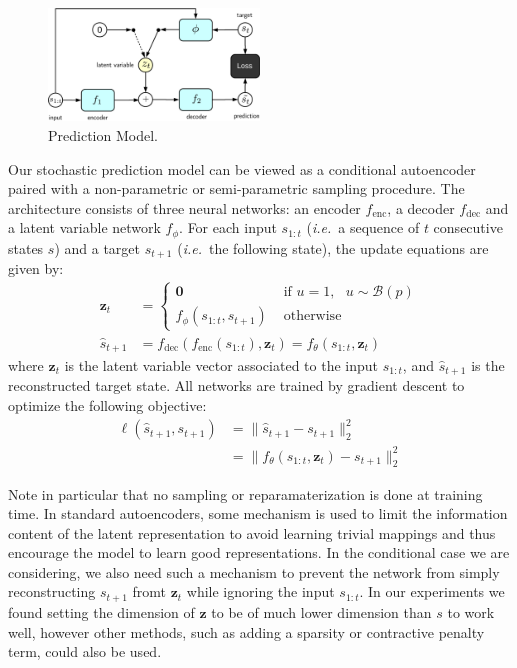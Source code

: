 \documentclass{article}
\begin{document}
\begin{figure}
  \centering
  \includegraphics[width=0.5\textwidth]{images/ae_train-crop.pdf}
  \caption{Prediction Model. }
\end{figure}

Our stochastic prediction model can be viewed as a conditional autoencoder paired with a non-parametric  or semi-parametric sampling procedure.
The architecture consists of three neural networks: an encoder $f_\text{enc}$, a decoder $f_\text{dec}$ and a latent variable network $f_\phi$.
For each input $s_{1:t}$ (\emph{i.e.}\ a sequence of $t$ consecutive states $s$) and a target $s_{t+1}$ (\emph{i.e.}\ the following state), the update equations are given by:
%
\begin{align}
  \bm{z}_t &=
  \begin{cases}
    \bm{0} & \mbox{   if   } u = 1, \mbox{   } u \sim \mathcal{B}(p) \\
    f_\phi(s_{1:t}, s_{t+1}) & \mbox{   otherwise}
  \end{cases} \\
  \hat{s}_{t+1} &= f_\text{dec}(f_\text{enc}(s_{1:t}), \bm{z}_t) = f_\theta(s_{1:t}, \bm{z}_t)
\end{align}
%
where $\bm{z}_t$ is the latent variable vector associated to the input $s_{1:t}$, and $\hat{s}_{t + 1}$ is the reconstructed target state.
All networks are trained by gradient descent to optimize the following objective:
%
\begin{align}
  \ell(\hat{s}_{t+1}, s_{t+1}) &= \lVert \hat{s}_{t+1} - s_{t+1} \rVert_2^2 \\
  &= \lVert f_\theta(s_{1:t}, \bm{z}_t) - s_{t+1} \rVert_2^2
\end{align}

Note in particular that no sampling or reparamaterization is done at training time.
In standard autoencoders, some mechanism is used to limit the information content of the latent representation to avoid learning trivial mappings and thus encourage the model to learn good representations.
In the conditional case we are considering, we also need such a mechanism to prevent the network from simply reconstructing $s_{t+1}$ fromt $\bm{z}_t$ while ignoring the input $s_{1:t}$.
In our experiments we found setting the dimension of $\bm{z}$ to be of much lower dimension than $s$ to work well, however other methods, such as adding a sparsity or contractive penalty term, could also be used.
\end{document}
